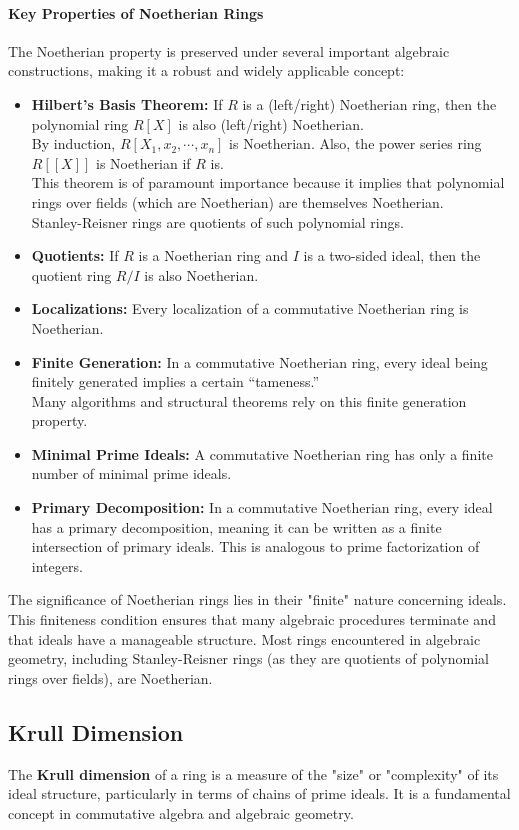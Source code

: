 \documentclass[12pt]{article}
\theoremstyle{definition}
\numberwithin{equation}{subsection}
\begin{document}
\paragraph{Key Properties of Noetherian Rings}
The Noetherian property is preserved under several important algebraic constructions, making it a robust and widely applicable concept:
\begin{itemize}
\item \textbf{Hilbert's Basis Theorem:} If $R$ is a (left/right) Noetherian ring, then the polynomial ring $R[X]$ is also (left/right) Noetherian.\\
By induction, $R[X_1, x_2, \cdots, x_n]$ is Noetherian. Also, the power series ring $R[[X]]$ is Noetherian if $R$ is.\\
This theorem is of paramount importance because it implies that polynomial rings over fields (which are Noetherian) are themselves Noetherian.\\
Stanley-Reisner rings are quotients of such polynomial rings.
\item \textbf{Quotients:} If $R$ is a Noetherian ring and $I$ is a two-sided ideal, then the quotient ring $R/I$ is also Noetherian.
\item \textbf{Localizations:} Every localization of a commutative Noetherian ring is Noetherian.
\item \textbf{Finite Generation:} In a commutative Noetherian ring, every ideal being finitely generated implies a certain ``tameness.''\\
Many algorithms and structural theorems rely on this finite generation property.
\item \textbf{Minimal Prime Ideals:} A commutative Noetherian ring has only a finite number of minimal prime ideals.
\item \textbf{Primary Decomposition:} In a commutative Noetherian ring, every ideal has a primary decomposition, meaning it can be written as a finite intersection of primary ideals. This is analogous to prime factorization of integers.
\end{itemize}
The significance of Noetherian rings lies in their "finite" nature concerning ideals. This finiteness condition ensures that many algebraic procedures terminate and that ideals have a manageable structure. Most rings encountered in algebraic geometry, including Stanley-Reisner rings (as they are quotients of polynomial rings over fields), are Noetherian.   


\subsection{Krull Dimension}
The \textbf{Krull dimension} of a ring is a measure of the "size" or "complexity" of its ideal structure, particularly in terms of chains of prime ideals. It is a fundamental concept in commutative algebra and algebraic geometry.
\end{document}
